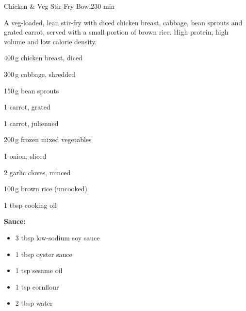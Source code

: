 
\begin{recipebox}{Chicken \& Veg Stir-Fry Bowl}{2}{30 min}

A veg-loaded, lean stir-fry with diced chicken breast, cabbage, bean sprouts
and grated carrot, served with a small portion of brown rice. High protein,
high volume and low calorie density.

\begin{ingredients}
  \item 400\,g chicken breast, diced
  \item 300\,g cabbage, shredded
  \item 150\,g bean sprouts
  \item 1 carrot, grated
  \item 1 carrot, julienned
  \item 200\,g frozen mixed vegetables
  \item 1 onion, sliced
  \item 2 garlic cloves, minced
  \item 100\,g brown rice (uncooked)
  \item 1 tbsp cooking oil
  \item \textbf{Sauce:}
  \begin{itemize}[leftmargin=1.5em]
    \item 3 tbsp low-sodium soy sauce
    \item 1 tbsp oyster sauce
    \item 1 tsp sesame oil
    \item 1 tsp cornflour
    \item 2 tbsp water
  \end{itemize}
\end{ingredients}


\end{recipebox}
